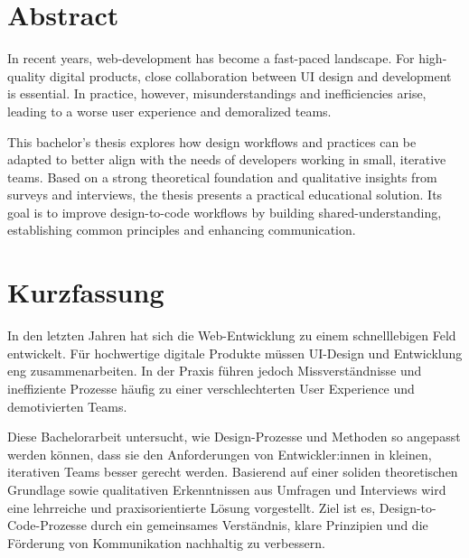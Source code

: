 \newpage
\section{Abstract}
In recent years, web-development has become a fast-paced landscape. For high-quality digital
products, close collaboration between UI design and development is essential. In practice, however,
misunderstandings and inefficiencies arise, leading to a worse user experience and demoralized
teams.

This bachelor's thesis explores how design workflows and practices can be adapted to better align
with the needs of developers working in small, iterative teams. Based on a strong theoretical
foundation and qualitative insights from surveys and interviews, the thesis presents a practical
educational solution. Its goal is to improve design-to-code workflows by building
shared-understanding, establishing common principles and enhancing communication. 

\section{Kurzfassung}
In den letzten Jahren hat sich die Web-Entwicklung zu einem schnelllebigen Feld entwickelt. Für
hochwertige digitale Produkte müssen UI-Design und Entwicklung eng zusammenarbeiten. In der Praxis
führen jedoch Missverständnisse und ineffiziente Prozesse häufig zu einer verschlechterten User
Experience und demotivierten Teams.

Diese Bachelorarbeit untersucht, wie Design-Prozesse und Methoden so angepasst werden können, dass
sie den Anforderungen von Entwickler:innen in kleinen, iterativen Teams besser gerecht werden.
Basierend auf einer soliden theoretischen Grundlage sowie qualitativen Erkenntnissen aus Umfragen
und Interviews wird eine lehrreiche und praxisorientierte Lösung vorgestellt. Ziel ist es,
Design-to-Code-Prozesse durch ein gemeinsames Verständnis, klare Prinzipien und die Förderung von
Kommunikation nachhaltig zu verbessern.
